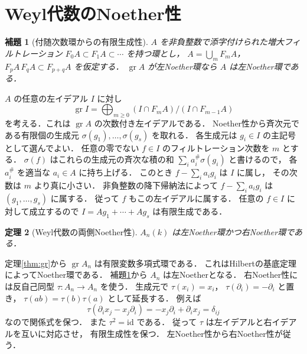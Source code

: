 \documentclass[a5paper,10pt,onecolumn]{jsarticle}
\makeatletter
\theoremstyle{mathnotetheorem}
\newtheorem{theorem}{定理}[section]
\newtheorem{lemma}[theorem]{補題}
\renewcommand{\proofname}{証明}
\renewenvironment{proof}[1][\proofname]{%
  \par\pushQED{\qed}\normalfont\topsep4\p@\@plus2\p@\relax
  \trivlist\item[\hskip\labelsep\bfseries #1]\ignorespaces
}{\popQED\endtrivlist\@endpefalse}
\makeatother
\begin{document}
\section{Weyl代数のNoether性}
\begin{lemma}[付随次数環からの有限生成性]\label{lem:filtered}
$A$ を非負整数で添字付けられた増大フィルトレーション
$F_0A\subset F_1A\subset\cdots$ を持つ環とし，
$A=\bigcup_mF_mA$，
$F_pA\,F_qA\subset F_{p+q}A$ を仮定する．
$\operatorname{gr}A$ が左Noether環なら $A$ は左Noether環である．
\end{lemma}
\begin{proof}
$A$ の任意の左イデアル $I$ に対し
\[
 \operatorname{gr}I=
 \bigoplus_{m\ge0}(I\cap F_mA)/(I\cap F_{m-1}A)
\]
を考える．これは $\operatorname{gr}A$ の次数付き左イデアルである．
Noether性から斉次元である有限個の生成元
$\sigma(g_1),\ldots,\sigma(g_s)$ を取れる．
各生成元は $g_i\in I$ の主記号として選んでよい．
任意の零でない $f\in I$ のフィルトレーション次数を $m$ とする．
$\sigma(f)$ はこれらの生成元の斉次な積の和
$\sum_i a_i^\#\sigma(g_i)$ と書けるので，
各 $a_i^\#$ を適当な $a_i\in A$ に持ち上げる．
このとき
$f-\sum_i a_i g_i$ は $I$ に属し，
その次数は $m$ より真に小さい．
非負整数の降下帰納法によって
$f-\sum_i a_i g_i$ は $(g_1,\ldots,g_s)$ に属する．
従って $f$ もこの左イデアルに属する．
任意の $f\in I$ に対して成立するので
$I=Ag_1+\cdots+Ag_s$ は有限生成である．
\end{proof}
\begin{theorem}[Weyl代数の両側Noether性]\label{thm:noether}
$A_n(k)$ は左Noether環かつ右Noether環である．
\end{theorem}
\begin{proof}
定理\ref{thm:gr}から
$\operatorname{gr}A_n$ は有限変数多項式環である．
これはHilbertの基底定理によってNoether環である．
補題\ref{lem:filtered}から $A_n$ は左Noetherとなる．
右Noether性には反自己同型
$\tau:A_n\to A_n$ を使う．
生成元で
$\tau(x_i)=x_i$，
$\tau(\partial_i)=-\partial_i$ と置き，
$\tau(ab)=\tau(b)\tau(a)$ として延長する．
例えば
\[
 \tau(\partial_ix_j-x_j\partial_i)
 =-x_j\partial_i+\partial_ix_j=\delta_{ij}
\]
なので関係式を保つ．
また $\tau^2=\mathrm{id}$ である．
従って $\tau$ は左イデアルと右イデアルを互いに対応させ，
有限生成性を保つ．
左Noether性から右Noether性が従う．
\end{proof}
\end{document}
